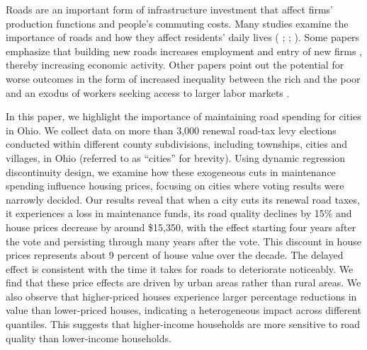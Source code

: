 Roads are an important form of infrastructure investment that affect firms’ production functions and people’s commuting costs. Many studies examine the importance of roads and how they affect residents' daily lives ( \citeyear{currier2023};  \citeyear{adukia2020};  \citeyear{asher2020}). Some papers emphasize that building new roads increases employment and entry of new firms \citep{gibbons2019new}, thereby increasing economic activity. Other papers point out the potential for worse outcomes in the form of increased inequality between the rich and the poor \citep{hettige2006} and an exodus of workers seeking access to larger labor markets \citep{asher2020}.  
 
In this paper, we highlight the importance of maintaining road spending for cities in Ohio. We collect data on more than 3,000 renewal road-tax levy elections conducted within different county subdivisions, including townships, cities and villages, in Ohio (referred to as “cities” for brevity). Using dynamic regression discontinuity design, we examine how these exogeneous cuts in maintenance spending influence housing prices, focusing on cities where voting results were narrowly decided. Our results reveal that when a city cuts its renewal road taxes, it experiences a loss in maintenance funds, its road quality declines by 15\% and house prices decrease by around \$15,350, with the effect starting four years after the vote and persisting through many years after the vote. This discount in house prices represents about 9 percent of house value over the decade. The delayed effect is consistent with the time it takes for roads to deteriorate noticeably. We find that these price effects are driven by urban areas rather than rural areas. We also observe that higher-priced houses experience larger percentage reductions in value than lower-priced houses, indicating a heterogeneous impact across different quantiles. This suggests that higher-income households are more sensitive to road quality than lower-income households. 


